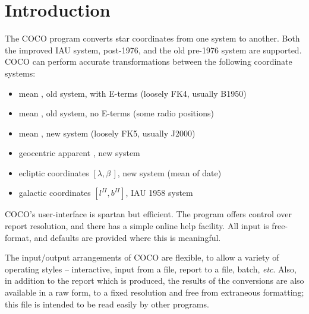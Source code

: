  \newpage
 \begin{latexonly}
   \setlength{\parskip}{0mm}
   \latexonlytoc
   \setlength{\parskip}{\medskipamount}
   \markright{\stardocname}
 \end{latexonly}
\newpage
\renewcommand{\thepage}{\arabic{page}}
\setcounter{page}{1}


\section{Introduction}

The COCO program converts star coordinates from one system to
another.  Both the improved IAU system, post-1976, and the old pre-1976
system are supported.
COCO can perform accurate transformations between the following
coordinate systems:
\begin{itemize}
\item mean \radec, old system, with E-terms (loosely FK4, usually B1950)
\item mean \radec, old system, no E-terms (some radio positions)
\item mean \radec, new system (loosely FK5, usually J2000)
\item geocentric apparent \radec, new system
\item ecliptic coordinates $[\lambda,\beta\,]$, new system (mean of date)
\item galactic coordinates $[l^{II},b^{II}]$, IAU 1958 system
\end{itemize}
COCO's user-interface is spartan but efficient.  The program
offers control over report resolution, and there has a simple online help
facility.
All input is free-format, and defaults are provided where this
is meaningful.

The input/output arrangements of COCO are flexible, to allow
a variety of operating styles -- interactive, input from a file,
report to a file, batch, {\it etc}.
Also, in addition to the report which is produced, the results of the
conversions are also available in a raw form, to a fixed resolution
and free from extraneous formatting; this file is intended
to be read easily by other programs.

